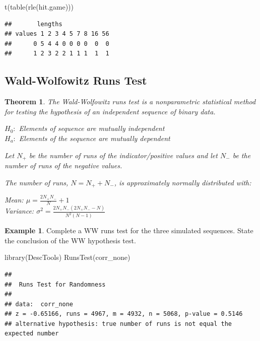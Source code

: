 \documentclass[
  11pt,
]{book}
\newenvironment{Shaded}{\begin{snugshade}}{\end{snugshade}}
\newcommand{\FunctionTok}[1]{\textcolor[rgb]{0.00,0.00,0.00}{#1}}
\newcommand{\NormalTok}[1]{#1}
\newtheorem{theorem}{Theorem}[chapter]
\theoremstyle{definition}
\theoremstyle{definition}
\newtheorem{example}{Example}[chapter]
\theoremstyle{definition}
\theoremstyle{definition}
\theoremstyle{remark}
\begin{document}
\begin{Shaded}
\begin{Highlighting}[]
\FunctionTok{t}\NormalTok{(}\FunctionTok{table}\NormalTok{(}\FunctionTok{rle}\NormalTok{(hit.game)))}
\end{Highlighting}
\end{Shaded}

\begin{verbatim}
##       lengths
## values 1 2 3 4 5 7 8 16 56
##      0 5 4 4 0 0 0 0  0  0
##      1 2 3 2 2 1 1 1  1  1
\end{verbatim}

\newpage

\hypertarget{wald-wolfowitz-runs-test}{%
\subsection{Wald-Wolfowitz Runs Test}\label{wald-wolfowitz-runs-test}}

\begin{theorem}
The Wald-Wolfowitz runs test is a nonparametric statistical method for testing the hypothesis of an independent sequence of binary data.

\(H_0:\) Elements of sequence are mutually independent\\
\(H_a:\) Elements of the sequence are mutually dependent

Let \(N_+\) be the number of runs of the indicator/positive values and let \(N_-\) be the number of runs of the negative values.

The number of runs, \(N = N_+ + N_-\), is approximately normally distributed with:

Mean: \(\mu=\frac{2N_+N_-}{N}+1\)\\
Variance: \(\sigma^2 = \frac{2N_+N_-(2N_+N_- - N)}{N^2(N-1)}\)
\end{theorem}

\begin{example}
Complete a WW runs test for the three simulated sequences. State the conclusion of the WW hypothesis test.
\end{example}

\begin{Shaded}
\begin{Highlighting}[]
\FunctionTok{library}\NormalTok{(DescTools)}
\FunctionTok{RunsTest}\NormalTok{(corr\_none)}
\end{Highlighting}
\end{Shaded}

\begin{verbatim}
## 
##  Runs Test for Randomness
## 
## data:  corr_none
## z = -0.65166, runs = 4967, m = 4932, n = 5068, p-value = 0.5146
## alternative hypothesis: true number of runs is not equal the expected number
\end{verbatim}
\end{document}
